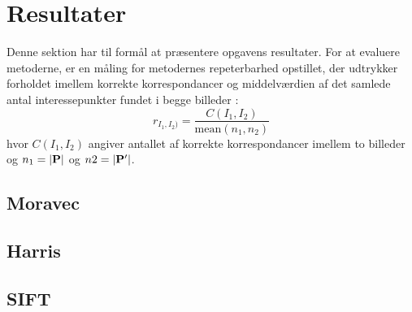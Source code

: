 \chapter{Resultater}
Denne sektion har til formål at præsentere opgavens resultater. For at evaluere metoderne, er en måling for metodernes repeterbarhed opstillet, der udtrykker forholdet imellem korrekte korrespondancer og middelværdien af det samlede antal interessepunkter fundet i begge billeder \cite{eval}:
\begin{equation}
r_{I_1,I_2)}=\dfrac{C(I_1,I_2)}{\text{mean}(n_1,n_2)}
\end{equation}
hvor $C(I_1,I_2)$ angiver antallet af korrekte korrespondancer imellem to billeder og $n_1=\bold{|P|}$ og $n2=\bold{|P'|}$.
\section{Moravec}
\section{Harris}
\section{SIFT}
